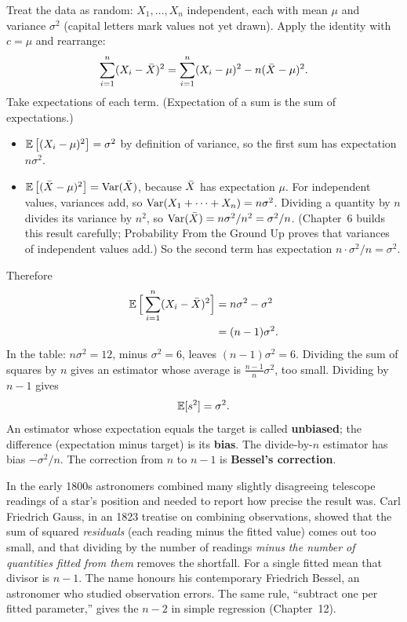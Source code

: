 Treat the data as random: $X_1,\dots,X_n$ independent, each with mean $\mu$ and
variance $\sigma^2$ (capital letters mark values not yet drawn). Apply the identity
with $c=\mu$ and rearrange:
\[
  \sum_{i=1}^n (X_i - \bar{X})^2 = \sum_{i=1}^n (X_i - \mu)^2 - n(\bar{X} - \mu)^2 .
\]
Take expectations of each term. (Expectation of a sum is the sum of expectations.)
\begin{itemize}
  \item $\operatorname{\mathbb{E}}\big[(X_i - \mu)^2\big] = \sigma^2$ by definition of variance, so the first
  sum has expectation $n\sigma^2$.
  \item $\operatorname{\mathbb{E}}\big[(\bar{X}-\mu)^2\big] = \operatorname{Var}(\bar{X})$, because $\bar{X}$ has expectation
  $\mu$. For independent values, variances add, so $\operatorname{Var}(X_1+\dots+X_n) = n\sigma^2$.
  Dividing a quantity by $n$ divides its variance by $n^2$, so
  $\operatorname{Var}(\bar{X}) = n\sigma^2/n^2 = \sigma^2/n$. (Chapter~6 builds this result
  carefully; Probability From the Ground Up proves that variances of independent
  values add.) So the second term has expectation $n \cdot \sigma^2/n = \sigma^2$.
\end{itemize}
Therefore
\begin{align*}
  \operatorname{\mathbb{E}}\Big[\sum_{i=1}^n (X_i - \bar{X})^2\Big] &= n\sigma^2 - \sigma^2 \\
                                           &= (n-1)\sigma^2 .
\end{align*}
In the table: $n\sigma^2 = 12$, minus $\sigma^2 = 6$, leaves $(n-1)\sigma^2 = 6$.
Dividing the sum of squares by $n$ gives an estimator whose average is
$\frac{n-1}{n}\sigma^2$, too small. Dividing by $n-1$ gives
\[
  \operatorname{\mathbb{E}}[s^2] = \sigma^2 .
\]
An estimator whose expectation equals the target is called \textbf{unbiased}; the
difference (expectation minus target) is its \textbf{bias}. The divide-by-$n$
estimator has bias $-\sigma^2/n$. The correction from $n$ to $n-1$ is
\textbf{Bessel's correction}.

\begin{historybox}
In the early 1800s astronomers combined many slightly disagreeing telescope readings
of a star's position and needed to report how precise the result was. Carl Friedrich
Gauss, in an 1823 treatise on combining observations, showed that the sum of squared
\emph{residuals} (each reading minus the fitted value) comes out too small, and that
dividing by the number of readings \emph{minus the number of quantities fitted from
them} removes the shortfall. For a single fitted mean that divisor is $n-1$. The name
honours his contemporary Friedrich Bessel, an astronomer who studied observation
errors. The same rule, ``subtract one per fitted parameter,'' gives the $n-2$ in
simple regression (Chapter~12).
\end{historybox}

